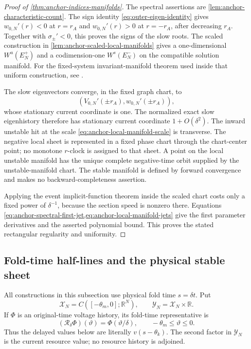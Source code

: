 \begin{proof}[Proof of \cref{thm:anchor-indices-manifolds}]
The spectral assertions are \cref{lem:anchor-characteristic-count}.  The
sign identity \cref{eq:outer-eigen-identity} gives
\(w_{0,N}'(r)<0\) at \(r=r_A\) and
\(w_{0,N}'(r)>0\) at \(r=-r_A\), after decreasing \(r_A\).  Together with
\(\sigma_\pm'<0\), this proves the signs of the slow roots.  The scaled
construction in \cref{lem:anchor-scaled-local-manifolds} gives a
one-dimensional \(W^u(E_N^+)\) and a codimension-one \(W^s(E_N^-)\) on
the compatible solution manifold.  For the fixed-system
invariant-manifold theorem used inside that uniform construction, see
\citet[Chs.~7 and~10]{hale1993introduction}.

The slow eigenvectors converge, in the fixed graph chart, to
\begin{equation}
 \left(V_{0,N}'(\pm r_A),w_{0,N}'(\pm r_A)\right),  \label{eq:anchor-slow-eigenvector}
\end{equation}
whose stationary current coordinate is one.  The normalized exact slow
eigenhistory therefore has stationary current coordinate
\(1+O(\delta^2)\).  The inward unstable hit at the scale
\cref{eq:anchor-local-manifold-scale} is transverse.  The negative local
sheet is represented in a fixed phase chart through the chart-center point;
no monotone \(r\)-clock is assigned to that sheet.  A point on the local unstable
manifold has the unique complete negative-time orbit supplied by the
unstable-manifold chart.  The stable manifold is defined by forward
convergence and makes no backward-completeness assertion.

Applying the event implicit-function theorem inside the scaled chart costs
only a fixed power of \(\delta^{-1}\), because the section speed is nonzero
there.  Equations
\cref{eq:anchor-spectral-first-jet,eq:anchor-local-manifold-jets}
give the first parameter derivatives and the asserted polynomial bound.  This
proves the stated rectangular regularity and uniformity.
\end{proof}

\subsection{Fold-time half-lines and the physical stable sheet}
\label{sec:anchored-fold-time-half-lines}

All constructions in this subsection use physical fold time \(s=\delta t\).
Put
\begin{equation}
 \mathscr X_N=C([-\theta_m,0];\mathbb R^N),
 \qquad
 \mathscr Y_N=\mathscr X_N\times\mathbb R.          \label{eq:anchor-fixed-delay-space}
\end{equation}
If \(\Phi\) is an original-time voltage history, its fold-time
representative is
\begin{equation}
 (\mathcal R_\delta\Phi)(\vartheta)
 =\Phi(\vartheta/\delta),\qquad -\theta_m\le\vartheta\le0.
                                                               \label{eq:anchor-history-rescaling}
\end{equation}
Thus the delayed values below are literally \(v(s-\theta_k)\).  The second
factor in \(\mathscr Y_N\) is the current resource value; no resource
history is adjoined.

